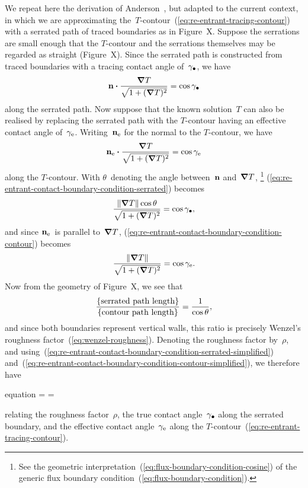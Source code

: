 We repeat here the derivation of
Anderson~\cite[Section~6.4.2]{anderson-2002-thesis-boundary-tracing-pdes},
but adapted to the current context,
in which we are approximating
the~$T$-contour~(\ref{eq:re-entrant-tracing-contour})
with a serrated path of traced boundaries
as in Figure~X. %
Suppose the serrations are small enough
that the $T$-contour and the serrations themselves
may be regarded as straight
(Figure~X). %
Since the serrated path is constructed from traced boundaries
with a tracing contact angle of~$\gamma_\bullet$,
we have
\begin{equation}
  \mathop{}\!\boldsymbol{\mathbf{n}} \boldsymbol{\cdot} \frac{\mathop{}\!\boldsymbol{\mathbf{\nabla}} T}{\sqrt{1 + (\mathop{}\!\boldsymbol{\mathbf{\nabla}} T)^2}} = \cos\gamma_\bullet
  \label{eq:re-entrant-contact-boundary-condition-serrated}
\end{equation}
along the serrated path.
Now suppose that the known solution~$T$ can also be realised
by replacing the serrated path with the $T$-contour
having an effective contact angle of~$\gamma_{\mathrm{e}}$.
Writing~$\mathop{}\!\boldsymbol{\mathbf{n}}_{\mathrm{e}}$ for the normal to the $T$-contour,
we have
\begin{equation}
  \mathop{}\!\boldsymbol{\mathbf{n}}_{\mathrm{e}} \boldsymbol{\cdot} \frac{\mathop{}\!\boldsymbol{\mathbf{\nabla}} T}{\sqrt{1 + (\mathop{}\!\boldsymbol{\mathbf{\nabla}} T)^2}} = \cos\gamma_{\mathrm{e}}
  \label{eq:re-entrant-contact-boundary-condition-contour}
\end{equation}
along the $T$-contour.
With $\theta$~denoting the angle between~$\mathop{}\!\boldsymbol{\mathbf{n}}$ and~$\mathop{}\!\boldsymbol{\mathbf{\nabla}} T$,%
\footnote{
  See the geometric interpretation~(\ref{eq:flux-boundary-condition-cosine})
  of the generic flux boundary condition~(\ref{eq:flux-boundary-condition}).
}
(\ref{eq:re-entrant-contact-boundary-condition-serrated}) becomes
\begin{equation}
  \frac{\lVert\mathop{}\!\boldsymbol{\mathbf{\nabla}} T\rVert \cos\theta}{\sqrt{1 + (\mathop{}\!\boldsymbol{\mathbf{\nabla}} T)^2}} = \cos\gamma_\bullet,
  \label{eq:re-entrant-contact-boundary-condition-serrated-simplified}
\end{equation}
and since $\mathop{}\!\boldsymbol{\mathbf{n}}_{\mathrm{e}}$~is parallel to~$\mathop{}\!\boldsymbol{\mathbf{\nabla}} T$,
(\ref{eq:re-entrant-contact-boundary-condition-contour}) becomes
\begin{equation}
  \frac{\lVert\mathop{}\!\boldsymbol{\mathbf{\nabla}} T\rVert}{\sqrt{1 + (\mathop{}\!\boldsymbol{\mathbf{\nabla}} T)^2}} = \cos\gamma_{\mathrm{e}}.
  \label{eq:re-entrant-contact-boundary-condition-contour-simplified}
\end{equation}
Now from the geometry of Figure~X, we see that
\begin{equation}
  \frac{\left\{\textnormal{serrated path length}\right\}}{\left\{\textnormal{contour path length}\right\}}
   = \frac{1}{\cos\theta},
   \label{eq:path-length-ratio}
\end{equation}
and since both boundaries represent vertical walls,
this ratio is precisely Wenzel's roughness factor~(\ref{eq:wenzel-roughness}).
Denoting the roughness factor by~$\rho$,
and using~(\ref{eq:re-entrant-contact-boundary-condition-serrated-simplified})
and~(\ref{eq:re-entrant-contact-boundary-condition-contour-simplified}),
we therefore have
\begin{important}{equation}
  \rho =  = \frac{\cos\gamma_\eff}{\cos\tr{\gamma}}
  \label{eq:roughness-cosine-ratio}
\end{important}
relating the roughness factor~$\rho$,
the true contact angle~$\gamma_\bullet$ along the serrated boundary,
and the effective contact angle~$\gamma_{\mathrm{e}}$
along the $T$-contour~(\ref{eq:re-entrant-tracing-contour}).

